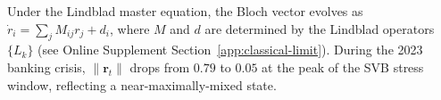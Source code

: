 Under the Lindblad master equation, the Bloch vector evolves as
$\dot{r}_i = \sum_j M_{ij} r_j + d_i$, where $M$ and $d$ are determined by
the Lindblad operators $\{L_k\}$ (see Online Supplement Section~\ref{app:classical-limit}).
During the 2023 banking crisis, $\|\mathbf{r}_t\|$ drops from $0.79$ to $0.05$
at the peak of the SVB stress window, reflecting a near-maximally-mixed state.
